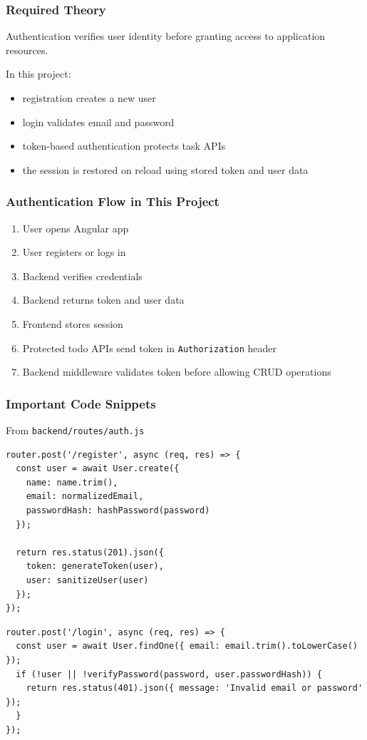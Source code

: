 \documentclass[12pt,a4paper]{article}
\begin{document}
\subsubsection*{Required Theory}
Authentication verifies user identity before granting access to application resources.

In this project:
\begin{itemize}
  \item registration creates a new user
  \item login validates email and password
  \item token-based authentication protects task APIs
  \item the session is restored on reload using stored token and user data
\end{itemize}

\subsubsection*{Authentication Flow in This Project}
\begin{enumerate}
  \item User opens Angular app
  \item User registers or logs in
  \item Backend verifies credentials
  \item Backend returns token and user data
  \item Frontend stores session
  \item Protected todo APIs send token in \texttt{Authorization} header
  \item Backend middleware validates token before allowing CRUD operations
\end{enumerate}

\subsubsection*{Important Code Snippets}
From \texttt{backend/routes/auth.js}
\begin{lstlisting}[style=projectcode]
router.post('/register', async (req, res) => {
  const user = await User.create({
    name: name.trim(),
    email: normalizedEmail,
    passwordHash: hashPassword(password)
  });

  return res.status(201).json({
    token: generateToken(user),
    user: sanitizeUser(user)
  });
});
\end{lstlisting}

\begin{lstlisting}[style=projectcode]
router.post('/login', async (req, res) => {
  const user = await User.findOne({ email: email.trim().toLowerCase() });
  if (!user || !verifyPassword(password, user.passwordHash)) {
    return res.status(401).json({ message: 'Invalid email or password' });
  }
});
\end{lstlisting}
\end{document}
